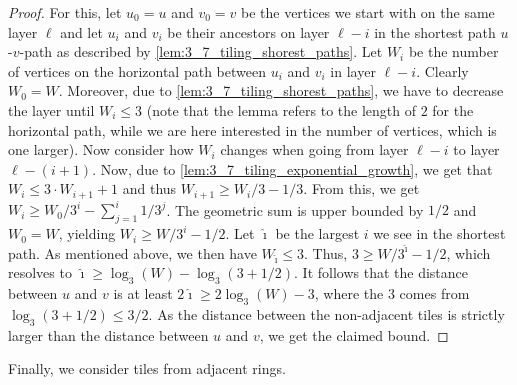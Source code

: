 \documentclass[a4paper,english,cleveref,thm-restate]{lipics-v2021}
\begin{document}
\begin{proof}
    For this, let $u_0 = u$ and $v_0 = v$ be the vertices we start with on the same layer $\ell$ and let $u_i$ and $v_i$ be their ancestors on layer $\ell - i$ in the shortest path $u$-$v$-path as described by \cref{lem:3_7_tiling_shorest_paths}.
    Let $W_i$ be the number of vertices on the horizontal path between $u_i$ and $v_i$ in layer $\ell - i$.
    Clearly $W_0 = W$.
    Moreover, due to \cref{lem:3_7_tiling_shorest_paths}, we have to decrease the layer until $W_i \le 3$ (note that the lemma refers to the length of $2$ for the horizontal path, while we are here interested in the number of vertices, which is one larger).
    Now consider how $W_i$ changes when going from layer $\ell - i$ to layer $\ell - (i + 1)$.
    Now, due to \cref{lem:3_7_tiling_exponential_growth}, we get that $W_i \le 3 \cdot W_{i + 1} + 1$ and thus $W_{i + 1} \ge W_i / 3 - 1/3$.
    From this, we get $W_i \ge W_0 / 3^i - \sum_{j = 1}^i 1/3^j$.
    The geometric sum is upper bounded by $1/2$ and $W_0 = W$, yielding $W_i \ge W / 3^i - 1/2$.
    Let $\hat\imath$ be the largest $i$ we see in the shortest path.
    As mentioned above, we then have $W_{\hat\imath} \le 3$.
    Thus, $3 \ge W / 3^{\hat\imath} - 1/2$, which resolves to $\hat\imath \ge \log_3(W) - \log_3(3 + 1/2)$.
    It follows that the distance between $u$ and $v$ is at least $2\hat\imath \ge 2 \log_3(W) - 3$, where the $3$ comes from $\log_3(3 + 1/2) \le 3/2$.  As the distance between the non-adjacent tiles is strictly larger than the distance between $u$ and $v$, we get the claimed bound. 
\end{proof}

Finally, we consider tiles from adjacent rings.
\end{document}
